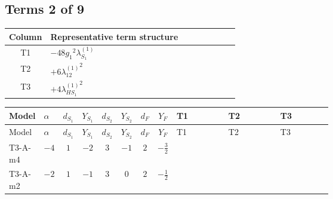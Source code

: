 \documentclass[8pt]{article}
\begin{document}
\begin{landscape}
\subsection*{Terms 2 of 9}
\begin{center}
\begin{tabular}{@{}c >{\raggedright\arraybackslash}p{0.82\linewidth}@{}}
\toprule
Column & Representative term structure \\
\midrule
T1 & \(\displaystyle -48 {g_1}^2 {\lambda_{S_1}^{(1)}}\) \\
\midrule
T2 & \(\displaystyle +6 {\lambda_{12}^{(1)}}^2\) \\
\midrule
T3 & \(\displaystyle +4 {\lambda_{HS_1}^{(1)}}^2\) \\
\midrule
\bottomrule
\end{tabular}
\end{center}
\smallskip
\tiny
\begin{longtable}{@{}llcccccc >{\raggedright\arraybackslash}p{0.21\linewidth} >{\raggedright\arraybackslash}p{0.21\linewidth} >{\raggedright\arraybackslash}p{0.21\linewidth}@{}}
\toprule
Model & $\alpha$ & $d_{S_1}$ & $Y_{S_1}$ & $d_{S_2}$ & $Y_{S_2}$ & $d_F$ & $Y_F$ & T1 & T2 & T3 \\
\midrule
\endfirsthead
\toprule
Model & $\alpha$ & $d_{S_1}$ & $Y_{S_1}$ & $d_{S_2}$ & $Y_{S_2}$ & $d_F$ & $Y_F$ & T1 & T2 & T3 \\
\midrule
\endhead
T3-A-m4 & $-4$ & $1$ & $-2$ & $3$ & $-1$ & $2$ & $-\frac{3}{2}$ & \scriptsize\adjustbox{max width=\linewidth}{$\begin{gathered} -48 {g_1}^2 {\lambda_{S_1}^{(1)}}\end{gathered}$} & \scriptsize\adjustbox{max width=\linewidth}{$\begin{gathered} +6 {\lambda_{12}^{(1)}}^2\end{gathered}$} & \scriptsize\adjustbox{max width=\linewidth}{$\begin{gathered} +4 {\lambda_{HS_1}^{(1)}}^2\end{gathered}$} \\
\midrule
T3-A-m2 & $-2$ & $1$ & $-1$ & $3$ & $0$ & $2$ & $-\frac{1}{2}$ & \scriptsize\adjustbox{max width=\linewidth}{$\begin{gathered} -12 {g_1}^2 {\lambda_{S_1}^{(1)}}\end{gathered}$} & \scriptsize\adjustbox{max width=\linewidth}{$\begin{gathered} +6 {\lambda_{12}^{(1)}}^2\end{gathered}$} & \scriptsize\adjustbox{max width=\linewidth}{$\begin{gathered} +4 {\lambda_{HS_1}^{(1)}}^2\end{gathered}$} \\

\end{longtable}
\end{landscape}
\end{document}
